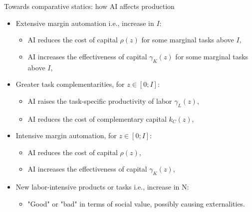 \documentclass{beamer}
\begin{document}
\begin{frame}{Towards comparative statics: how AI affects production}

\begin{itemize}
    \item Extensive margin automation i.e., increase in \(I\):
    \begin{itemize}
        \item AI reduces the cost of capital \(\rho(z)\) for some marginal tasks above \(I\),
        \item AI increases the effectiveness of capital \(\gamma_K(z)\) for some marginal tasks above \(I\),
    \end{itemize}
    \item Greater task complementarities, for \(z\in[0;I]\):
    \begin{itemize}
        \item AI raises the task-specific productivity of labor \(\gamma_L(z)\),
        \item AI reduces the cost of complementary capital \(k_C(z)\),
    \end{itemize} 
    \item Intensive margin automation, for \(z\in[0;I]\):
    \begin{itemize}
        \item AI reduces the cost of capital \(\rho(z)\),
        \item AI increases the effectiveness of capital \(\gamma_K(z)\),
    \end{itemize}
    \item New labor-intensive products or tasks i.e., increase in N:
    \begin{itemize}
        \item "Good" or "bad" in terms of social value, possibly causing externalities.
    \end{itemize}
\end{itemize}
    
\end{frame}
\end{document}
